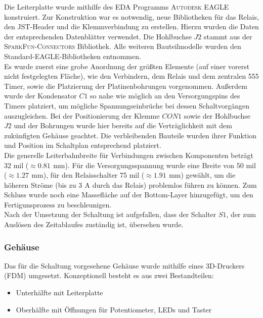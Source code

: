\documentclass[a4paper, 12pt]{article}
\begin{document}
        Die Leiterplatte wurde mithilfe des EDA Programms \textsc{Autodesk EAGLE} konstruiert.   Zur Konstruktion war es notwendig, neue Bibliotheken für das Relais, den JST-Header und die Klemmverbindung zu erstellen. Hierzu wurden die Daten der entsprechenden Datenblätter verwendet. Die Hohlbuchse $J2$ stammt aus der \textsc{SparkFun-Connectors} Bibliothek. Alle weiteren Bauteilmodelle wurden den Standard-EAGLE-Bibliotheken entnommen.\\

        Es wurde zuerst eine grobe Anordnung der größten Elemente (auf einer vorerst nicht festgelegten Fläche), wie den Verbindern, dem Relais und dem zentralen 555 Timer, sowie die Platzierung der Platinenbohrungen vorgenommen. Außerdem wurde der Kondensator $C1$ so nahe wie möglich an den Versorgungspins des Timers platziert, um mögliche Spannungseinbrüche bei dessen Schaltvorgängen auszugleichen. Bei der Positionierung der Klemme $CON1$ sowie der Hohlbuchse $J2$ und der Bohrungen wurde hier bereits auf die Verträglichkeit mit dem zukünfigten Gehäuse geachtet. Die verbleibenden Bauteile wurden ihrer Funktion und Position im Schaltplan entsprechend platziert. \\


        Die generelle Leiterbahnbreite für Verbindungen zwischen Komponenten beträgt 32 mil ($\approx 0.81\,\ \si{\milli\meter}$). Für die Versorgungsspannung wurde eine Breite von 50 mil ($\approx 1.27\,\ \si{\milli\meter}$), für den Relaisschalter 75 mil ($\approx 1.91\,\ \si{\milli\meter}$) gewählt, um die höheren Ströme (bis zu $3 \,\ \si{\ampere}$ durch das Relais) problemlos führen zu können. Zum Schluss wurde noch eine Massefläche auf der Bottom-Layer hinzugefügt, um den Fertigunsprozess zu beschleunigen.\\

        Nach der Umsetzung der Schaltung ist aufgefallen, dass der Schalter $S1$, der zum Auslösen des Zeitablaufes zuständig ist, übersehen wurde.\\

        

    \subsubsection{Gehäuse}
      Das für die Schaltung vorgesehene Gehäuse wurde mithilfe eines 3D-Druckers (FDM) umgesetzt. Konzeptionell besteht es aus zwei Bestandteilen:
      \begin{itemize}
        \item Unterhälfte \small mit Leiterplatte
        \item Oberhälfte \small mit Öffnungen für Potentiometer, LEDs und Taster
      \end{itemize}
\end{document}
